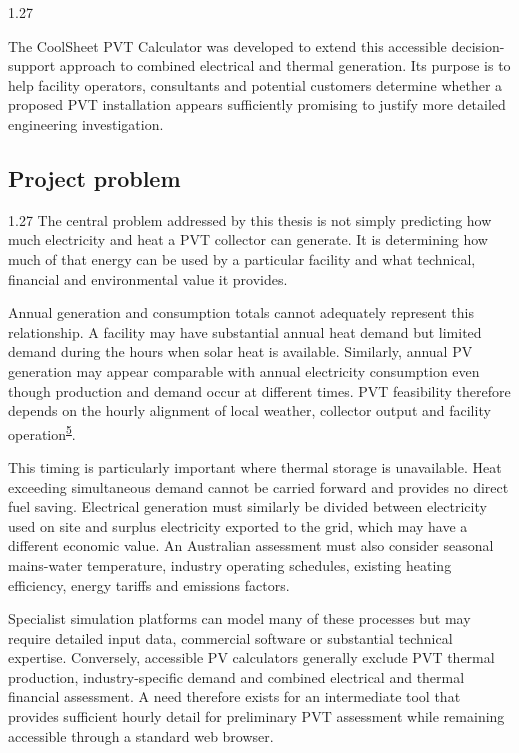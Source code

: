 \documentclass[12pt,letterpaper]{article}
\newcommand{\done}{\ \textcolor{green!45!black}{$\checkmark$}} %
\DeclareRobustCommand{\citenum}[1]{\hyperlink{ref:#1}{#1}} %
\begin{document}
\begin{spacing}{1.27}
\vspace{0.15in}

The CoolSheet PVT Calculator was developed to extend this accessible decision-support approach to combined electrical and thermal generation. Its purpose is to help facility operators, consultants and potential customers determine whether a proposed PVT installation appears sufficiently promising to justify more detailed engineering investigation.
\end{spacing}

\subsection[Project problem\done]{Project problem}\label{sec3}

\begin{spacing}{1.27}
The central problem addressed by this thesis is not simply predicting how much electricity and heat a PVT collector can generate. It is determining how much of that energy can be used by a particular facility and what technical, financial and environmental value it provides.\par

\vspace{0.15in}

Annual generation and consumption totals cannot adequately represent this relationship. A facility may have substantial annual heat demand but limited demand during the hours when solar heat is available. Similarly, annual PV generation may appear comparable with annual electricity consumption even though production and demand occur at different times. PVT feasibility therefore depends on the hourly alignment of local weather, collector output and facility operation\textsuperscript{\citenum{5}}.\par

\vspace{0.15in}

This timing is particularly important where thermal storage is unavailable. Heat exceeding simultaneous demand cannot be carried forward and provides no direct fuel saving. Electrical generation must similarly be divided between electricity used on site and surplus electricity exported to the grid, which may have a different economic value. An Australian assessment must also consider seasonal mains-water temperature, industry operating schedules, existing heating efficiency, energy tariffs and emissions factors.\par

\vspace{0.15in}

Specialist simulation platforms can model many of these processes but may require detailed input data, commercial software or substantial technical expertise. Conversely, accessible PV calculators generally exclude PVT thermal production, industry-specific demand and combined electrical and thermal financial assessment. A need therefore exists for an intermediate tool that provides sufficient hourly detail for preliminary PVT assessment while remaining accessible through a standard web browser.
\end{spacing}
\end{document}
